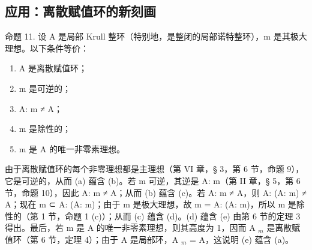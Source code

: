 \subsection{应用：离散赋值环的新刻画}

命题 11. 设 A 是局部 Krull 整环（特别地，是整闭的局部诺特整环），m 是其极大理想。以下条件等价：

\begin{enumerate}
\def\labelenumi{(\alph{enumi})}
\item
  A 是离散赋值环；
\item
  m 是可逆的；
\item
  A: m ≠ A；
\item
  m 是除性的；
\item
  m 是 A 的唯一非零素理想。
\end{enumerate}

由于离散赋值环的每个非零理想都是主理想（第 VI 章，§ 3，第 6 节，命题 9），它是可逆的，从而 (a) 蕴含 (b)。若 m 可逆，其逆是 A: m（第 II 章，§ 5，第 6 节，命题 10），因此 A: m ≠ A；从而 (b) 蕴含 (c)。若 A: m ≠ A，则 A: (A: m) ≠ A；现在 m ⊂ A: (A: m)；由于 m 是极大理想，故 m = A: (A: m)，所以 m 是除性的（第 1 节，命题 1 (c)）；从而 (c) 蕴含 (d)。(d) 蕴含 (e) 由第 6 节的定理 3 得出。最后，若 m 是 A 的唯一非零素理想，则其高度为 1，因而 A \(_{m}\) 是离散赋值环（第 6 节，定理 4）；由于 A 是局部环，A \(_{m}\) = A，这说明 (e) 蕴含 (a)。

